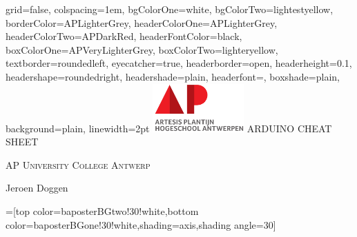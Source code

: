 \documentclass[landscape,final,a0paper]{baposter}
\begin{document}
\newlength{\leftimgwidth}
\begin{poster}%
  {
  grid=false,
  colspacing=1em,
  bgColorOne=white,
  bgColorTwo=lightestyellow,
  borderColor=APLighterGrey,
  headerColorOne=APLighterGrey,
  headerColorTwo=APDarkRed,
  headerFontColor=black,
  boxColorOne=APVeryLighterGrey,
  boxColorTwo=lighteryellow,
  textborder=roundedleft,
  eyecatcher=true,
  headerborder=open,
  headerheight=0.1\textheight,
  headershape=roundedright,
  headershade=plain,
  headerfont=\LARGE\textsf, %
  boxshade=plain,
  background=plain,
  linewidth=2pt
  }
  {
  \includegraphics[height=5em]{AP.png}
  } %
  {\sf %
  ARDUINO CHEAT SHEET}
  {\sf %
  \vspace{0.05em}
  \textsc{AP University College Antwerp}
  
  Jeroen Doggen
  }
  {%
  }

  =[top color=baposterBGtwo!30!white,bottom color=baposterBGone!30!white,shading=axis,shading angle=30]

     \setlength{\leftimgwidth}{0.78em+8.0em}


\end{poster}
\end{document}
